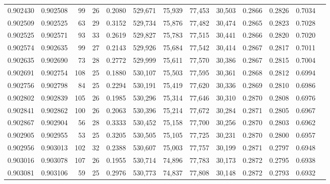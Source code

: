 \begin{tabular}{rrrrrrrrrrrrr}
0.902430 & 0.902508 &    99 &  26 &                                     0.2080 & 529,671 &  75,939 &  77,453 &  30,503 & 0.2866 & 0.2826 & 0.7034 \\
0.902509 & 0.902525 &    63 &  29 &                                     0.3152 & 529,734 &  75,876 &  77,482 &  30,474 & 0.2865 & 0.2823 & 0.7028 \\
0.902525 & 0.902571 &    93 &  33 &                                     0.2619 & 529,827 &  75,783 &  77,515 &  30,441 & 0.2866 & 0.2820 & 0.7020 \\
0.902574 & 0.902635 &    99 &  27 &                                     0.2143 & 529,926 &  75,684 &  77,542 &  30,414 & 0.2867 & 0.2817 & 0.7011 \\
0.902635 & 0.902690 &    73 &  28 &                                     0.2772 & 529,999 &  75,611 &  77,570 &  30,386 & 0.2867 & 0.2815 & 0.7004 \\
0.902691 & 0.902754 &   108 &  25 &                                     0.1880 & 530,107 &  75,503 &  77,595 &  30,361 & 0.2868 & 0.2812 & 0.6994 \\
0.902756 & 0.902798 &    84 &  25 &                                     0.2294 & 530,191 &  75,419 &  77,620 &  30,336 & 0.2869 & 0.2810 & 0.6986 \\
0.902802 & 0.902839 &   105 &  26 &                                     0.1985 & 530,296 &  75,314 &  77,646 &  30,310 & 0.2870 & 0.2808 & 0.6976 \\
0.902841 & 0.902862 &   100 &  26 &                                     0.2063 & 530,396 &  75,214 &  77,672 &  30,284 & 0.2871 & 0.2805 & 0.6967 \\
0.902867 & 0.902904 &    56 &  28 &                                     0.3333 & 530,452 &  75,158 &  77,700 &  30,256 & 0.2870 & 0.2803 & 0.6962 \\
0.902905 & 0.902955 &    53 &  25 &                                     0.3205 & 530,505 &  75,105 &  77,725 &  30,231 & 0.2870 & 0.2800 & 0.6957 \\
0.902956 & 0.903013 &   102 &  32 &                                     0.2388 & 530,607 &  75,003 &  77,757 &  30,199 & 0.2871 & 0.2797 & 0.6948 \\
0.903016 & 0.903078 &   107 &  26 &                                     0.1955 & 530,714 &  74,896 &  77,783 &  30,173 & 0.2872 & 0.2795 & 0.6938 \\
0.903081 & 0.903106 &    59 &  25 &                                     0.2976 & 530,773 &  74,837 &  77,808 &  30,148 & 0.2872 & 0.2793 & 0.6932 \\

\end{tabular}
